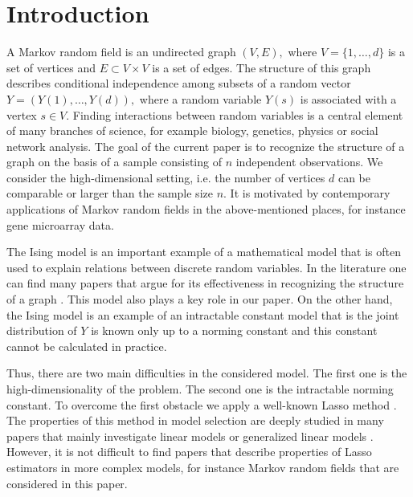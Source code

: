 \documentclass[twoside,11pt]{article}
\begin{document}
\section{Introduction}
\label{introduction}

A Markov random field is an undirected graph $(V,E),$ where $V=\{1,\ldots, d\}$ is a set of vertices and $E \subset V \times V$ is a set of edges. The structure of this graph describes conditional independence among subsets of a random vector 
$Y=(Y(1),\ldots,Y(d)),$ where a random variable $Y(s)$ is associated with a vertex
$s \in V.$ Finding interactions between random variables is a central element of many branches of science, for example biology, genetics, physics or social network analysis. 
The goal of the current paper is to recognize the structure of a graph on the basis of a sample consisting of $n$ independent observations. We consider the high-dimensional setting, i.e. the number of vertices $d$ can be comparable or larger than the sample size $n.$ It is motivated by contemporary applications of Markov random fields in the above-mentioned places, for instance gene microarray data.  


The Ising model \citep{Ising25} is an important example of a mathematical model that is often used to explain relations between discrete random variables. In the literature one can find many papers that argue for its effectiveness in recognizing the structure of a graph 
\citep{Ravi10, HofTib09,Guoetal10, Xueetal12, Jalali11}. This model also plays  a key role in our paper. On the other hand, the Ising model is an example of an intractable constant model that is  the joint distribution of $Y$ is known only up to a norming constant and this constant cannot be calculated in practice. 

Thus, there are two main difficulties in the considered model. The first one is the high-dimensionality of the problem. The second one is the intractable norming constant. To overcome the first obstacle we apply a well-known Lasso method \citep{Tibsch96}.   
The properties of this method in model selection are deeply studied in many papers that mainly investigate
linear models or generalized linear models \citep{Bickel09, geerbuhl11, HuangGLM12, Geer2008, YeZhang10, zhaoYu06, zhou09}. However, it is not difficult to find papers that describe properties of Lasso estimators in more complex models, for instance Markov random fields \citep{banerjee08, geerbuhl11, Ravi10, HofTib09,Guoetal10, Xueetal12} that are considered in this paper.
\end{document}
